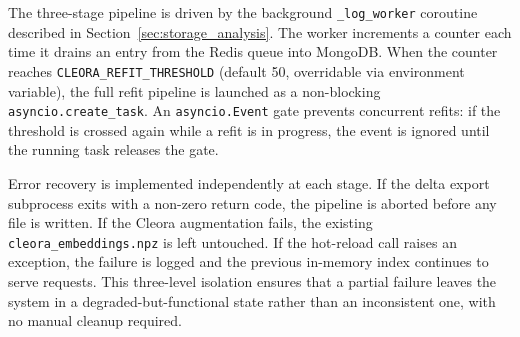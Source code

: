 The three-stage pipeline is driven by the background \texttt{\_log\_worker} coroutine described in Section~\ref{sec:storage_analysis}.
The worker increments a counter each time it drains an entry from the Redis queue into MongoDB.
When the counter reaches \texttt{CLEORA\_REFIT\_THRESHOLD} (default 50, overridable via environment variable), the full refit pipeline is launched as a non-blocking \texttt{asyncio.create\_task}.
An \texttt{asyncio.Event} gate prevents concurrent refits: if the threshold is crossed again while a refit is in progress, the event is ignored until the running task releases the gate.

Error recovery is implemented independently at each stage.
If the delta export subprocess exits with a non-zero return code, the pipeline is aborted before any file is written.
If the Cleora augmentation fails, the existing \texttt{cleora\_embeddings.npz} is left untouched.
If the hot-reload call raises an exception, the failure is logged and the previous in-memory index continues to serve requests.
This three-level isolation ensures that a partial failure leaves the system in a degraded-but-functional state rather than an inconsistent one, with no manual cleanup required.
